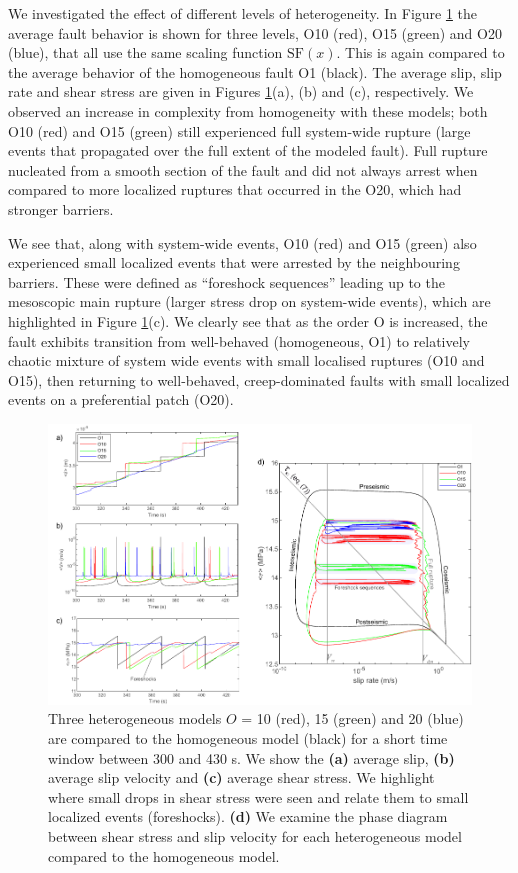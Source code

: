 \documentclass[preprint,1p, 10pt,authoryear]{elsarticle}
\begin{document}
We investigated the effect of different levels of heterogeneity. In Figure \ref{fig7} the average fault behavior is shown for three levels, O10 (red), O15 (green) and O20 (blue), that all use the same scaling function $\mathrm{SF}(x)$.  This is again compared to the average behavior of the homogeneous fault O1 (black).  The average slip, slip rate and shear stress are given in Figures \ref{fig7}(a), (b) and (c), respectively.  We observed an increase in complexity from homogeneity with these models; both O10 (red) and O15 (green) still experienced full system-wide rupture (large events that propagated over the full extent of the modeled fault).  Full rupture nucleated from a smooth section of the fault and did not always arrest when compared to more localized ruptures that occurred in the O20, which had stronger barriers. 

We see that, along with system-wide events, O10 (red) and O15 (green) also experienced small localized events that were arrested by the neighbouring barriers. These were defined as ``foreshock sequences'' leading up to the mesoscopic main rupture (larger stress drop on system-wide events), which are highlighted in Figure \ref{fig7}(c). We clearly see that as the order O is increased, the fault exhibits transition from well-behaved (homogeneous, O1) to relatively chaotic mixture of system wide events with small localised ruptures (O10 and O15), then returning to well-behaved, creep-dominated faults with small localized events on a preferential patch (O20).

\begin{figure}
	\centering
	\includegraphics{FIG7.pdf} 
	\caption{Three heterogeneous models $O$ =  10 (red), 15 (green) and 20 (blue) are compared to the homogeneous model (black) for a short time window between 300 and 430 s. We show the \textbf{(a)} average slip, \textbf{(b)} average slip velocity and \textbf{(c)} average shear stress.  We highlight where small drops in shear stress were seen and relate them to small localized events (foreshocks). \textbf{(d)} We examine the phase diagram between shear stress and slip velocity for each heterogeneous model compared to the homogeneous model.}
	\label{fig7}
\end{figure} 
\end{document}
